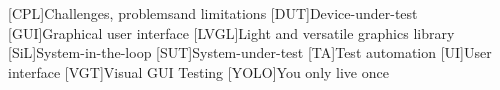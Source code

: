 \documentclass[Proposal,BIC,english,IEEE]{BASE/twbook} %
\begin{document}
\listoffigures                                                   %
\clearpage

\clearpage

\clearpage

{}
\chapter*{\listacroname}
\begin{acronym}
    [CPL]{Challenges, problemsand limitations}
    [DUT]{Device-under-test}
    [GUI]{Graphical user interface}
    [LVGL]{Light and versatile graphics library}
    [SiL]{System-in-the-loop}
    [SUT]{System-under-test}
    [TA]{Test automation}
    [UI]{User interface}
    [VGT]{Visual GUI Testing}
    [YOLO]{You only live once}
\end{acronym}
\clearpage
\clearpage
\end{document}
